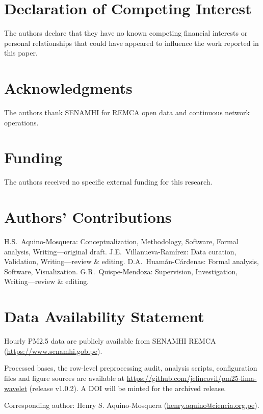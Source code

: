 \documentclass[12pt,letterpaper]{article}
\begin{document}
\section*{Declaration of Competing Interest}
The authors declare that they have no known competing financial interests or personal relationships that could have appeared to influence the work reported in this paper.

\section*{Acknowledgments}
The authors thank SENAMHI for REMCA open data and continuous network operations.

\section*{Funding}
The authors received no specific external funding for this research.

\section*{Authors' Contributions}
H.S.~Aquino-Mosquera: Conceptualization, Methodology, Software, Formal analysis, Writing---original draft.
J.E.~Villanueva-Ram\'irez: Data curation, Validation, Writing---review \& editing.
D.A.~Huam\'an-C\'ardenas: Formal analysis, Software, Visualization.
G.R.~Quispe-Mendoza: Supervision, Investigation, Writing---review \& editing.

\section*{Data Availability Statement}
Hourly PM2.5 data are publicly available from SENAMHI REMCA (\url{https://www.senamhi.gob.pe}).
\begin{sloppypar}
Processed bases, the row-level preprocessing audit, analysis scripts, configuration files and figure sources are available at \url{https://github.com/jelincovil/pm25-lima-wavelet} (release v1.0.2). A DOI will be minted for the archived release.
\end{sloppypar}

\noindent Corresponding author: Henry S. Aquino-Mosquera (\url{henry.aquino@ciencia.org.pe}).
\end{document}
